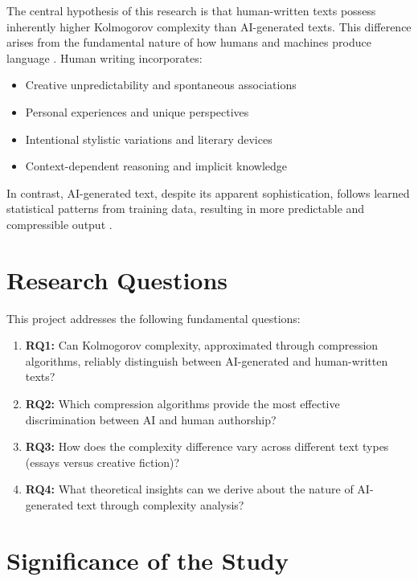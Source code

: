 \documentclass[12pt,a4paper]{report}
\begin{document}
The central hypothesis of this research is that human-written texts possess inherently higher Kolmogorov complexity than AI-generated texts. This difference arises from the fundamental nature of how humans and machines produce language \cite{li2008introduction}. Human writing incorporates:
\begin{itemize}
    \item Creative unpredictability and spontaneous associations
    \item Personal experiences and unique perspectives
    \item Intentional stylistic variations and literary devices
    \item Context-dependent reasoning and implicit knowledge
\end{itemize}

In contrast, AI-generated text, despite its apparent sophistication, follows learned statistical patterns from training data, resulting in more predictable and compressible output \cite{martin2021implicit}.

\section{Research Questions}

This project addresses the following fundamental questions:

\begin{enumerate}
    \item \textbf{RQ1:} Can Kolmogorov complexity, approximated through compression algorithms, reliably distinguish between AI-generated and human-written texts?

    \item \textbf{RQ2:} Which compression algorithms provide the most effective discrimination between AI and human authorship?

    \item \textbf{RQ3:} How does the complexity difference vary across different text types (essays versus creative fiction)?

    \item \textbf{RQ4:} What theoretical insights can we derive about the nature of AI-generated text through complexity analysis?
\end{enumerate}

\section{Significance of the Study}
\end{document}
